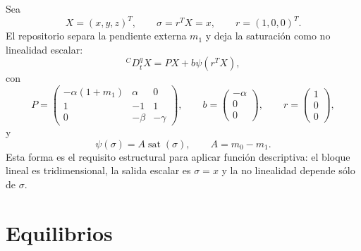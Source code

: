 \documentclass[11pt]{article}
\newcommand{\sat}{\operatorname{sat}}
\begin{document}
Sea
\[
X=(x,y,z)^T,
\qquad
\sigma=r^TX=x,
\qquad
r=(1,0,0)^T.
\]
El repositorio separa la pendiente externa \(m_1\) y deja la saturación como no linealidad escalar:
\begin{equation}
{}^C D_t^q X=PX+b\psi(r^TX),
\label{eq:lure_form}
\end{equation}
con
\begin{equation}
P=
\begin{pmatrix}
-\alpha(1+m_1) & \alpha & 0\\
1&-1&1\\
0&-\beta&-\gamma
\end{pmatrix},
\qquad
b=\begin{pmatrix}-\alpha\\0\\0\end{pmatrix},
\qquad
r=\begin{pmatrix}1\\0\\0\end{pmatrix},
\label{eq:lure_matrices}
\end{equation}
y
\begin{equation}
\psi(\sigma)=A\sat(\sigma),
\qquad
A=m_0-m_1.
\label{eq:psi_sat}
\end{equation}
Esta forma es el requisito estructural para aplicar función descriptiva: el bloque lineal es tridimensional, la salida escalar es \(\sigma=x\) y la no linealidad depende sólo de \(\sigma\).

\section{Equilibrios}
\end{document}

